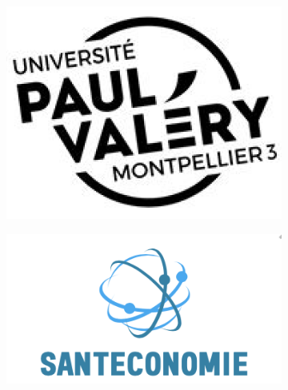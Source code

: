 \documentclass[12pt,a4paper]{report}
\begin{document}
\begin{titlepage}

\begin{center}
\begin{figure}[h]
    \centering
    \begin{subfigure}{0.3\textwidth}
        \centering
        \includegraphics[width=\linewidth]{images/Logo_univ.png}
    \end{subfigure}
    \hspace{3cm}
    \begin{subfigure}{0.4\textwidth}
        \centering
        \includegraphics[width=\linewidth]{images/Logo_SanEconomie.png}
    \end{subfigure}
    \label{fig:images}
\end{figure}


\end{center}
\end{titlepage}
\end{document}
